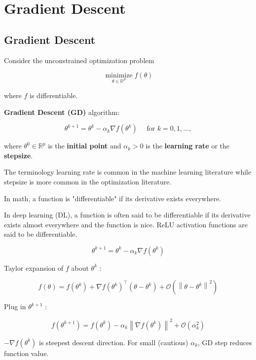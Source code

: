 \documentclass{report}
\begin{document}
\chapter{Gradient Descent}

\section{Gradient Descent}

\begin{definition}
    Consider the unconstrained optimization problem

    $$
    \underset{\theta \in \mathbb{R}^{P}}{\operatorname{minimize}} f(\theta)
    $$

    where $f$ is differentiable.

    \textbf{Gradient Descent (GD)} algorithm:

    $$
    \theta^{k+1}=\theta^{k}-\alpha_{k} \nabla f\left(\theta^{k}\right) \quad \text { for } k=0,1, \ldots,
    $$

    where $\theta^{0} \in \mathbb{R}^{p}$ is the \textbf{initial point} and $\alpha_{k}>0$ is the \textbf{learning rate} or the \textbf{stepsize}.

    The terminology learning rate is common in the machine learning literature while stepsize is more common in the optimization literature.
\end{definition}

In math, a function is "differentiable" if its derivative exists everywhere.

In deep learning (DL), a function is often said to be differentiable if its derivative exists almost everywhere and the function is nice.
ReLU activation functions are said to be differentiable.

\begin{concept}
    $$
    \theta^{k+1}=\theta^{k}-\alpha_{k} \nabla f\left(\theta^{k}\right)
    $$

    Taylor expansion of $f$ about $\theta^{k}$ :

    $$
    f(\theta)=f\left(\theta^{k}\right)+\nabla f\left(\theta^{k}\right)^{\top}\left(\theta-\theta^{k}\right)+\mathcal{O}\left(\left\|\theta-\theta^{k}\right\|^{2}\right)
    $$

    Plug in $\theta^{k+1}$ :

    $$
    f\left(\theta^{k+1}\right)=f\left(\theta^{k}\right)-\alpha_{k}\left\|\nabla f\left(\theta^{k}\right)\right\|^{2}+\mathcal{O}\left(\alpha_{k}^{2}\right)
    $$

    $-\nabla f\left(\theta^{k}\right)$ is steepest descent direction. For small (cautious) $\alpha_{k}$, GD step reduces function value.
\end{concept}
\end{document}

